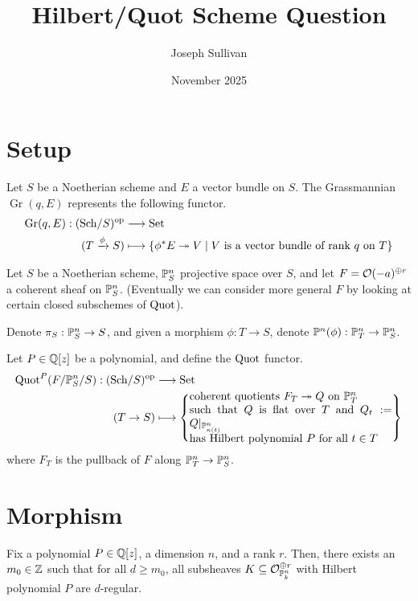 \documentclass[12pt]{article}
\title{Hilbert/Quot Scheme Question}
\author{Joseph Sullivan}
\date{November 2025}
\DeclareMathOperator{\Gr}{Gr}
\begin{document}
\maketitle
\tableofcontents

\section{Setup}

Let $S$ be a Noetherian scheme and $E$ a vector bundle on $S$. The Grassmannian $\Gr(q,E)$ represents the following functor.
\begin{align*}
    \Gr(q,E): (\Sch/S)^\op &\longrightarrow \Set\\
    (T\xrightarrow{\phi} S) &\longmapsto \{\phi^* E \twoheadrightarrow V \mid \text{$V$ is a vector bundle of rank $q$ on $T$}\}
\end{align*}

Let $S$ be a Noetherian scheme, $\P_S^n$ projective space over $S$, and let $F=\cO(-a)^{\oplus r}$ a coherent sheaf on $\P_S^n$. (Eventually we can consider more general $F$ by looking at certain closed subschemes of $\Quot$).

Denote $\pi_S: \P_S^n \to S$, and given a morphism $\phi: T\to S$, denote $\P^n(\phi): \P_T^n \to \P_S^n$.

Let $P\in \Q[z]$ be a polynomial, and define the $\Quot$ functor.
\begin{align*}
    \Quot^P(F/\P_S^n/S): (\Sch/S)^\op &\longrightarrow \Set\\
        (T\to S) &\longmapsto \left\{\parbox{18em}{coherent quotients $F_T\twoheadrightarrow Q$ on $\P_T^n$\\ such that $Q$ is flat over $T$ and $Q_t\defeq Q|_{\P^n_{\kappa(t)}}$\\ has Hilbert polynomial $P$ for all $t\in T$}\right\}
\end{align*}
where $F_T$ is the pullback of $F$ along $\P_T^n \to \P_S^n$.

\section{Morphism}

\begin{prop}
    Fix a polynomial $P\in \Q[z]$, a dimension $n$, and a rank $r$. Then, there exists an $m_0\in \Z$ such that for all $d\geq m_0$, all subsheaves $K\subseteq \cO_{\P^n_k}^{\oplus r}$ with Hilbert polynomial $P$ are $d$-regular.
\end{prop}
\end{document}
